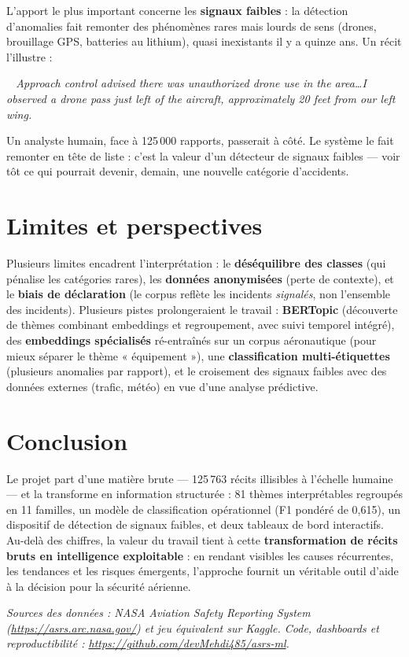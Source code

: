 \documentclass[11pt,a4paper]{article}
\newenvironment{narr}{%
  \begin{list}{}{\setlength{\leftmargin}{1.2em}\setlength{\rightmargin}{1.2em}}\item[]%
  \small\itshape\color{nblue}\guillemotleft~}{~\guillemotright\end{list}}
\begin{document}
L'apport le plus important concerne les \textbf{signaux faibles} : la détection d'anomalies
fait remonter des phénomènes rares mais lourds de sens (drones, brouillage GPS, batteries au
lithium), quasi inexistants il y a quinze ans. Un récit l'illustre :

\begin{narr}
Approach control advised there was unauthorized drone use in the area\ldots I observed a
drone pass just left of the aircraft, approximately 20 feet from our left wing.
\end{narr}

\noindent Un analyste humain, face à 125\,000 rapports, passerait à côté. Le système le fait
remonter en tête de liste : c'est la valeur d'un détecteur de signaux faibles — voir tôt ce
qui pourrait devenir, demain, une nouvelle catégorie d'accidents.

\section{Limites et perspectives}

Plusieurs limites encadrent l'interprétation : le \textbf{déséquilibre des classes} (qui
pénalise les catégories rares), les \textbf{données anonymisées} (perte de contexte), et le
\textbf{biais de déclaration} (le corpus reflète les incidents \emph{signalés}, non
l'ensemble des incidents). Plusieurs pistes prolongeraient le travail : \textbf{BERTopic}
(découverte de thèmes combinant embeddings et regroupement, avec suivi temporel intégré), des
\textbf{embeddings spécialisés} ré-entraînés sur un corpus aéronautique (pour mieux séparer le
thème « équipement »), une \textbf{classification multi-étiquettes} (plusieurs anomalies par
rapport), et le croisement des signaux faibles avec des données externes (trafic, météo) en
vue d'une analyse prédictive.

\section{Conclusion}

Le projet part d'une matière brute — 125\,763 récits illisibles à l'échelle humaine — et la
transforme en information structurée : 81 thèmes interprétables regroupés en 11 familles, un
modèle de classification opérationnel (F1 pondéré de 0,615), un dispositif de détection de
signaux faibles, et deux tableaux de bord interactifs. Au-delà des chiffres, la valeur du
travail tient à cette \textbf{transformation de récits bruts en intelligence exploitable} :
en rendant visibles les causes récurrentes, les tendances et les risques émergents,
l'approche fournit un véritable outil d'aide à la décision pour la sécurité aérienne.

\vfill
\noindent\footnotesize\textit{Sources des données : NASA Aviation Safety Reporting System
(\url{https://asrs.arc.nasa.gov/}) et jeu équivalent sur Kaggle. Code, dashboards et
reproductibilité : \url{https://github.com/devMehdi485/asrs-ml}.}
\end{document}
